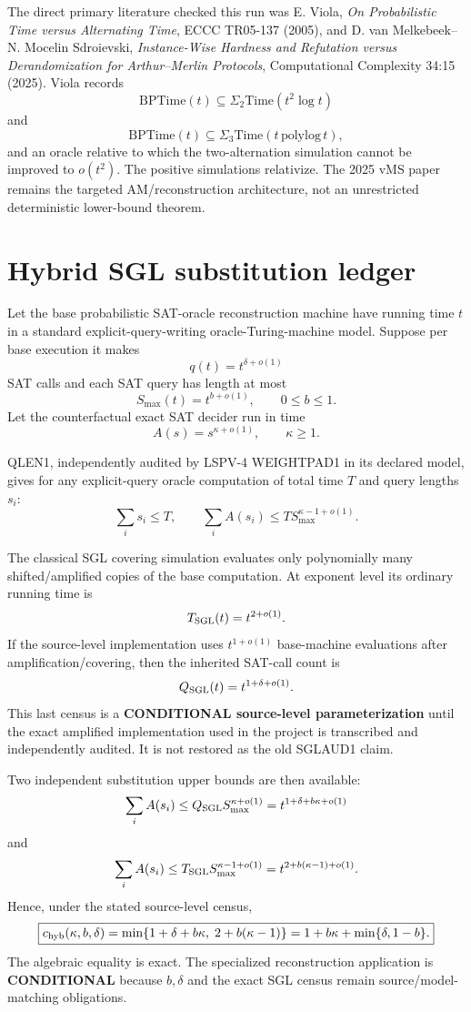 \documentclass[11pt]{article}
\begin{document}
The direct primary literature checked this run was E. Viola, \emph{On Probabilistic Time versus Alternating Time}, ECCC TR05-137 (2005), and D. van Melkebeek--N. Mocelin Sdroievski, \emph{Instance-Wise Hardness and Refutation versus Derandomization for Arthur--Merlin Protocols}, Computational Complexity 34:15 (2025). Viola records
\[
\mathrm{BPTime}(t)\subseteq\Sigma_2\mathrm{Time}(t^2\log t)
\]
and
\[
\mathrm{BPTime}(t)\subseteq\Sigma_3\mathrm{Time}(t\,\mathrm{polylog}\,t),
\]
and an oracle relative to which the two-alternation simulation cannot be improved to $o(t^2)$. The positive simulations relativize. The 2025 vMS paper remains the targeted AM/reconstruction architecture, not an unrestricted deterministic lower-bound theorem.

\section*{Hybrid SGL substitution ledger}
Let the base probabilistic SAT-oracle reconstruction machine have running time $t$ in a standard explicit-query-writing oracle-Turing-machine model. Suppose per base execution it makes
\[
q(t)=t^{\delta+o(1)}
\]
SAT calls and each SAT query has length at most
\[
S_{\max}(t)=t^{b+o(1)},\qquad 0\le b\le1.
\]
Let the counterfactual exact SAT decider run in time
\[
A(s)=s^{\kappa+o(1)},\qquad \kappa\ge1.
\]

QLEN1, independently audited by LSPV-4 WEIGHTPAD1 in its declared model, gives for any explicit-query oracle computation of total time $T$ and query lengths $s_i$:
\[
\sum_i s_i\le T,
\qquad
\sum_i A(s_i)\le T S_{\max}^{\kappa-1+o(1)}.
\]

The classical SGL covering simulation evaluates only polynomially many shifted/amplified copies of the base computation. At exponent level its ordinary running time is
\[
T_{\rm SGL}(t)=t^{2+o(1)}.
\]
If the source-level implementation uses $t^{1+o(1)}$ base-machine evaluations after amplification/covering, then the inherited SAT-call count is
\[
Q_{\rm SGL}(t)=t^{1+\delta+o(1)}.
\]
This last census is a \textbf{CONDITIONAL source-level parameterization} until the exact amplified implementation used in the project is transcribed and independently audited. It is not restored as the old SGLAUD1 claim.

Two independent substitution upper bounds are then available:
\[
\sum_i A(s_i)
\le Q_{\rm SGL}S_{\max}^{\kappa+o(1)}
=t^{1+\delta+b\kappa+o(1)}
\]
and
\[
\sum_i A(s_i)
\le T_{\rm SGL}S_{\max}^{\kappa-1+o(1)}
=t^{2+b(\kappa-1)+o(1)}.
\]
Hence, under the stated source-level census,
\[
\boxed{
c_{\rm hyb}(\kappa,b,\delta)
=
\min\{1+\delta+b\kappa,\;2+b(\kappa-1)\}
=
1+b\kappa+\min\{\delta,1-b\}.
}
\]
The algebraic equality is exact. The specialized reconstruction application is \textbf{CONDITIONAL} because $b,\delta$ and the exact SGL census remain source/model-matching obligations.
\end{document}

